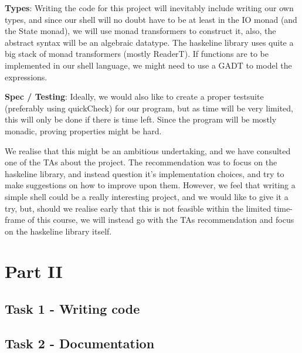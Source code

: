 \documentclass[11pt,a4paper]{article}
\begin{document}
\textbf{Types}: Writing the code for this project will inevitably include writing our own
types, and since our shell will no doubt have to be at least in the IO monad
(and the State monad), we will use monad transformers to construct it, also, the
abstract syntax will be an algebraic datatype.  The haskeline library uses quite
a big stack of monad transformers (mostly ReaderT). If functions are to be
implemented in our shell language, we might need to use a GADT to model the
expressions.

\textbf{Spec / Testing}: Ideally, we would also like to create  a proper testsuite
(preferably using quickCheck) for our program, but as time will be very limited,
this will only be done if there is time left. Since the program will be mostly
monadic, proving properties might be hard.

We realise that this might be an ambitious undertaking, and we have consulted
one of the TAs about the project. The recommendation was to focus on the
haskeline library, and instead question it’s implementation choices, and try to
make suggestions on how to improve upon them. However, we feel that writing a
simple shell could be a really interesting project, and we would like to give it
a try, but, should we realise early that this is not feasible within the limited
time-frame of this course, we will instead go with the TAs recommendation and
focus on the haskeline library itself.

\section{Part II}

\subsection{Task 1 - Writing code}

\subsection{Task 2 - Documentation}
\end{document}
